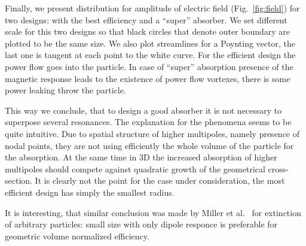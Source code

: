 \documentclass[aps,prl,twocolumn,showpacs,superscriptaddress,groupedaddress]{revtex4-1}
\begin{document}
\begin{figure}
\end{figure}
Finally, we present distribution for amplitude of electric field
(Fig.~\ref{fig:field}) for two designs: with the best efficiency and a
``super'' absorber.  We set different scale for this two designs so
that black circles that denote outer boundary are plotted to be the
same size.  We also plot streamlines for a Poynting vector, the last
one is tangent at each point to the white curve.  For the efficient
design the power flow goes into the particle.  In case of ``super''
absorption presence of the magnetic response leads to the existence of
power flow vortexes, there is some power leaking throw the particle.

This way we conclude, that to design a good absorber it is not
necessary to superpose several resonances.  The explanation for the
phenomena seems to be quite intuitive.  Due to spatial structure of
higher multipoles, namely presence of nodal points, they are not using
efficiently the whole volume of the particle for the absorption. At
the same time in 3D the increased absorption of higher multipoles should
compete against quadratic growth of the geometrical cross-section.  It
is clearly not the point for the case under consideration, the most
efficient design has simply the smallest radius.

It is interesting, that similar conclusion was made by Miller et
al.~\cite{Miller-2014} for extinction of arbitrary particles: small
size with only dipole responce is preferable for geometric volume
normalized efficiency.  
\end{document}
